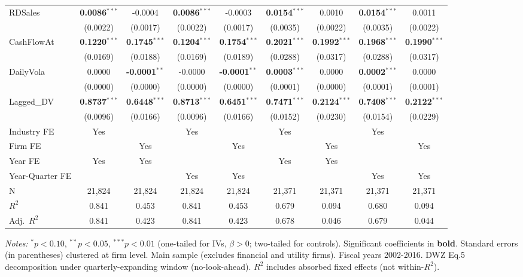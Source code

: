 \documentclass[11pt,a4paper]{article}
\begin{document}
\begin{table}[htbp]
\begin{tabular}{lcccccccc}
RDSales & \textbf{0.0086}$^{***}$ & -0.0004 & \textbf{0.0086}$^{***}$ & -0.0003 & \textbf{0.0154}$^{***}$ & 0.0010 & \textbf{0.0154}$^{***}$ & 0.0011 \\
 & (0.0022) & (0.0017) & (0.0022) & (0.0017) & (0.0035) & (0.0022) & (0.0035) & (0.0022) \\
CashFlowAt & \textbf{0.1220}$^{***}$ & \textbf{0.1745}$^{***}$ & \textbf{0.1204}$^{***}$ & \textbf{0.1754}$^{***}$ & \textbf{0.2021}$^{***}$ & \textbf{0.1992}$^{***}$ & \textbf{0.1968}$^{***}$ & \textbf{0.1990}$^{***}$ \\
 & (0.0169) & (0.0188) & (0.0169) & (0.0189) & (0.0288) & (0.0317) & (0.0288) & (0.0317) \\
DailyVola & 0.0000 & \textbf{-0.0001}$^{**}$ & -0.0000 & \textbf{-0.0001}$^{**}$ & \textbf{0.0003}$^{***}$ & 0.0000 & \textbf{0.0002}$^{***}$ & 0.0000 \\
 & (0.0000) & (0.0000) & (0.0000) & (0.0000) & (0.0001) & (0.0000) & (0.0001) & (0.0001) \\
Lagged\_DV & \textbf{0.8737}$^{***}$ & \textbf{0.6448}$^{***}$ & \textbf{0.8713}$^{***}$ & \textbf{0.6451}$^{***}$ & \textbf{0.7471}$^{***}$ & \textbf{0.2124}$^{***}$ & \textbf{0.7408}$^{***}$ & \textbf{0.2122}$^{***}$ \\
 & (0.0096) & (0.0166) & (0.0096) & (0.0166) & (0.0152) & (0.0230) & (0.0154) & (0.0229) \\
\midrule
Industry FE & Yes &  & Yes &  & Yes &  & Yes &  \\
Firm FE &  & Yes &  & Yes &  & Yes &  & Yes \\
Year FE & Yes & Yes &  &  & Yes & Yes &  &  \\
Year-Quarter FE &  &  & Yes & Yes &  &  & Yes & Yes \\
\midrule
N & 21,824 & 21,824 & 21,824 & 21,824 & 21,371 & 21,371 & 21,371 & 21,371 \\
$R^2$ & 0.841 & 0.453 & 0.841 & 0.453 & 0.679 & 0.094 & 0.680 & 0.094 \\
Adj.~$R^2$ & 0.841 & 0.423 & 0.841 & 0.423 & 0.678 & 0.046 & 0.679 & 0.044 \\
\bottomrule
\end{tabular}
\begin{minipage}{\linewidth}
\vspace{2pt}\scriptsize
\textit{Notes:} $^{*}p<0.10$, $^{**}p<0.05$, $^{***}p<0.01$ (one-tailed for IVs, $\beta > 0$; two-tailed for controls).
 Significant coefficients in \textbf{bold}.
 Standard errors (in parentheses) clustered at firm level.
 Main sample (excludes financial and utility firms). Fiscal years 2002-2016. DWZ Eq.5 decomposition under quarterly-expanding window (no-look-ahead).
 $R^2$ includes absorbed fixed effects (not within-$R^2$).
\end{minipage}
\end{table}
\end{document}
